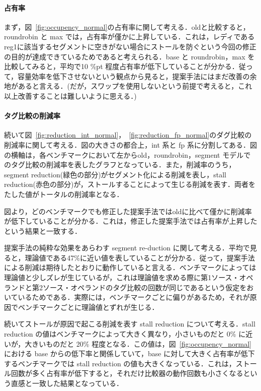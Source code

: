 \documentclass[twocolumn]{jsarticle}
\begin{document}
  \paragraph{占有率}
  まず，図~\ref{fig:occupency_normal}の占有率に関して考える．oldと比較すると，roundrobin と max では，占有率が僅かに上昇している．これは，レディであるreg1に該当するセグメントに空きがない場合にストールを防ぐという今回の修正の目的が達成できているためであると考えられる．base と roundrobin，max を比較してみると，平均で10 \%pt 程度占有率が低下していることが分かる．従って，容量効率を低下させないという観点から見ると，提案手法にはまだ改善の余地があると言える．(だが，スワップを使用しないという前提で考えると，これ以上改善することは難しいように思える．)
  \paragraph{タグ比較の削減率}
  続いて図~\ref{fig:reduction_int_normal}，~\ref{fig:reduction_fp_normal}のダグ比較の削減率に関して考える．図の大きさの都合上，int 系と fp 系に分割してある．図の横軸は，各ベンチマークにおいて左からold，roundrobin，segment モデルでのタグ比較の削減率を表したグラフとなっている．また，削減率のうち，segment reduction(緑色の部分)がセグメント化による削減を表し，stall reduction(赤色の部分)が，ストールすることによって生じる削減を表す．両者をたした値がトータルの削減率となる．
  
  図より，どのベンチマークでも修正した提案手法ではoldに比べて僅かに削減率が低下していることが分かる．これは，修正した提案手法では占有率が上昇したという結果と一致する．
  
  提案手法の純粋な効果をあらわす segment re-duction に関して考える．平均で見ると，理論値である47\%に近い値を表していることが分かる．従って，提案手法による削減は期待したとおりに動作していると言える．ベンチマークによっては理論値と少しズレが生じているが，これは理論値を求める際に第1ソース・オペランドと第2ソース・オペランドのタグ比較の回数が同じであるという仮定をおいているためである．実際には，ベンチマークごとに偏りがあるため，それが原因でベンチマークごとに理論値とずれが生じる．
  
  続いてストールが原因で起こる削減を表す stall reduction について考える．stall reduction の値はベンチマークによって大きく異なり，小さいものだと 0\% に近いが，大きいものだと 20\% 程度となる．この値は，図~\ref{fig:occupency_normal}における base からの低下率と関係していて，base に対して大きく占有率が低下するベンチマークでは stall reduction の値も大きくなっている．これは，ストール回数が多く占有率が低下すると，それだけ比較器の動作回数も小さくなるという直感と一致した結果となっている．
\end{document}
